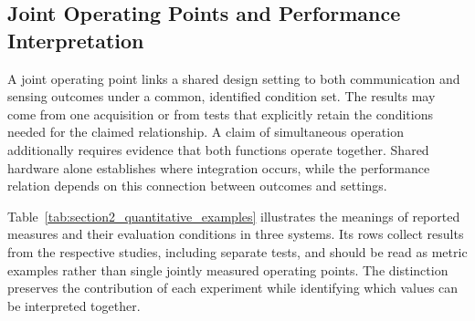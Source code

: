 \subsection{Joint Operating Points and Performance Interpretation}
\label{sec:joint_performance_interpretation}

A joint operating point links a shared design setting to both communication
and sensing outcomes under a common, identified condition set. The results
may come from one acquisition or from tests that explicitly retain the
conditions needed for the claimed relationship. A claim of simultaneous
operation additionally requires evidence that both functions operate together.
Shared hardware alone establishes where integration occurs, while the
performance relation depends on this connection between outcomes and settings.

Table~\ref{tab:section2_quantitative_examples} illustrates the meanings of
reported measures and their evaluation conditions in three systems.
Its rows collect results from the respective studies, including separate
tests, and should be read as metric examples rather than single jointly
measured operating points. The distinction preserves the contribution of
each experiment while identifying which values can be interpreted together.

